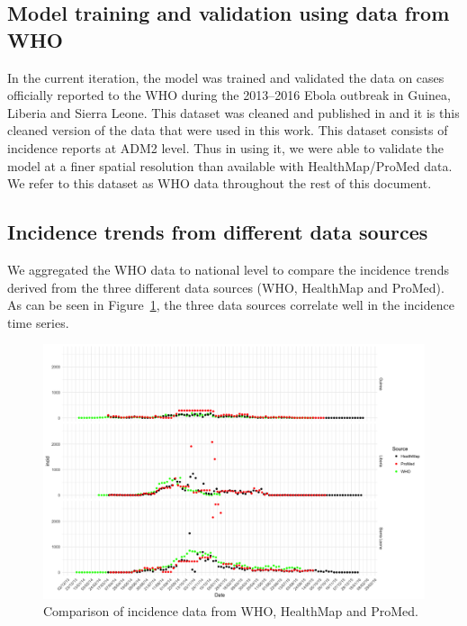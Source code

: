 \documentclass[11pt,]{article}
\begin{document}
\subsection{Model training and validation using data from
WHO}\label{model-training-and-validation-using-data-from-who}

In the current iteration, the model was trained and validated the data
on cases officially reported to the WHO during the 2013--2016 Ebola
outbreak in Guinea, Liberia and Sierra Leone. This dataset was cleaned
and published in \citep{garske20160308} and it is this cleaned version
of the data that were used in this work. This dataset consists of
incidence reports at ADM2 level. Thus in using it, we were able to validate the model at a finer spatial resolution than available
with HealthMap/ProMed data. We refer to this dataset as WHO data
throughout the rest of this document.

\subsection{Incidence trends from different data sources}
We aggregated the WHO data to national level to compare the incidence
trends derived from the three different data sources (WHO, HealthMap
and ProMed). As can be seen in Figure~\ref{fig:incid_comp}, the
three data sources correlate well in the incidence time series.

\begin{figure}
    \centering
        \includegraphics[width=\textwidth]{ms6-figures/who_vs_hm_vs_pm-incid}
        \caption{Comparison of incidence data from WHO, HealthMap and ProMed.}
        \label{fig:incid_comp}
  \end{figure}
\end{document}

